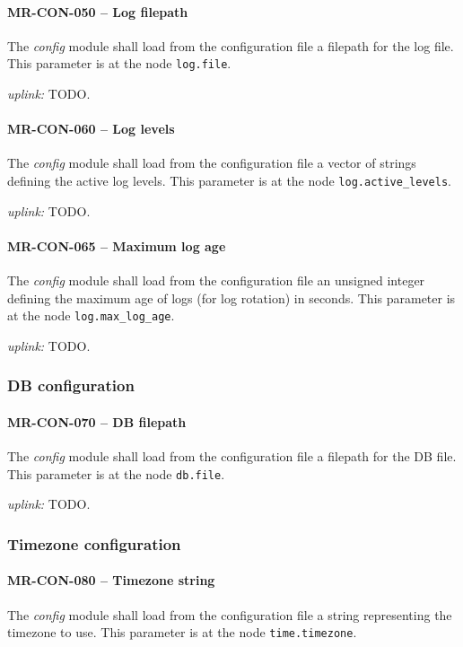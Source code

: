 \paragraph{MR-CON-050 -- Log filepath}
The \emph{config} module shall load from the configuration file a filepath
for the log file. This parameter is at the node \lstinline{log.file}.

\textit{uplink: } TODO.

\paragraph{MR-CON-060 -- Log levels}
The \emph{config} module shall load from the configuration file a vector of
strings defining the active log levels. This parameter is at the node
\lstinline{log.active_levels}.

\textit{uplink: } TODO.

\paragraph{MR-CON-065 -- Maximum log age}
The \emph{config} module shall load from the configuration file an
unsigned integer defining the maximum age of logs (for log rotation)
in seconds. This parameter is at the node \lstinline{log.max_log_age}.

\textit{uplink: } TODO.

\subsubsection{DB configuration}
\paragraph{MR-CON-070 -- DB filepath}
The \emph{config} module shall load from the configuration file a filepath
for the DB file. This parameter is at the node \lstinline{db.file}.

\textit{uplink: } TODO.

\subsubsection{Timezone configuration}
\paragraph{MR-CON-080 -- Timezone string}
The \emph{config} module shall load from the configuration file a string
representing the timezone to use. This parameter is at the node
\lstinline{time.timezone}.

